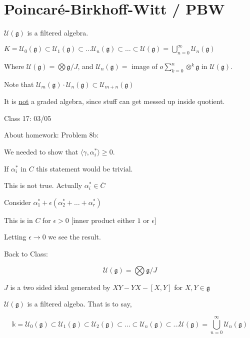 \documentclass{article}
\theoremstyle{definition}
\begin{document}
\section*{Poincar\'e-Birkhoff-Witt / PBW}

\(\mathcal{U} (\mathfrak{g} )\) is a filtered algebra.

\(K = \mathcal{U} _0(\mathfrak{g} ) \subset \mathcal{U} _1 (\mathfrak{g} ) \subset \dots \mathcal{U}_n (\mathfrak{g}) \subset \dots \subset \mathcal{U} (\mathfrak{g}) = \bigcup_{n=0}^{\infty} \mathcal{U} _n(\mathfrak{g} )\) 

Where \(\mathcal{U} (\mathfrak{g}) = \bigotimes \mathfrak{g} / J \), and \(\mathcal{U} _n(\mathfrak{g})= \) image of \(o\sum_{k=0}^n \otimes ^k \mathfrak{g} \) in \(\mathcal{U} (\mathfrak{g})\).

Note that \(\mathcal{U}_m(\mathfrak{g}) \cdot \mathcal{U}_n(\mathfrak{g}) \subset \mathcal{U} _{m + n}(\mathfrak{g})\) 

It is \underline{not} a graded algebra, since stuff can get messed up inside quotient.

\hrulefill

Class 17: 03/05

About homework: Problem 8b:

We needed to show that \(\langle \gamma , \alpha_i ^{\ast}  \rangle \geq 0\).

If \(\alpha_i ^{\ast} \) in \(C\) this statement would be trivial.

This is not true. Actually \(\alpha _i ^{\ast} \in \overline{C} \)

Consider \(\alpha_1 ^{\ast} + \epsilon (\alpha _2 ^{\ast} + \dots + \alpha _r ^{\ast})\)

This is in \(C\) for \(\epsilon > 0\) [inner product either \(1\) or \(\epsilon\)]

Letting \(\epsilon \to 0\) we see the result.

Back to Class:

\[
    \mathcal{U} (\mathfrak{g}) = \bigotimes \mathfrak{g} / J
\]

\(J\) is a two sided ideal generated by \(XY - YX - [X,Y]\) for \(X,Y\in \mathfrak{g}\) 

\(\mathcal{U} (\mathfrak{g} )\) is a filtered algeba. That is to say,

\[
    \mathbb{k} = \mathcal{U}_0(\mathfrak{g}) \subset \mathcal{U} _1 (\mathfrak{g} ) \subset \mathcal{U} _2(\mathfrak{g}) \subset \dots \subset \mathcal{U} _n (\mathfrak{g}) \subset \dots \mathcal{U} (\mathfrak{g}) = \bigcup_{n=0}^\infty \mathcal{U}_n(\mathfrak{g})
\]
\end{document}
